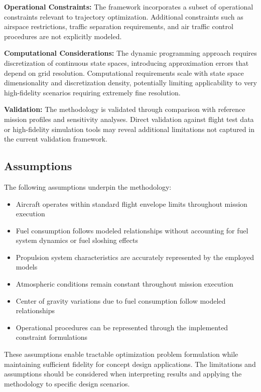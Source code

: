 \textbf{Operational Constraints:} The framework incorporates a subset of operational constraints relevant to trajectory optimization. Additional constraints such as airspace restrictions, traffic separation requirements, and air traffic control procedures are not explicitly modeled.

\textbf{Computational Considerations:} The dynamic programming approach requires discretization of continuous state spaces, introducing approximation errors that depend on grid resolution. Computational requirements scale with state space dimensionality and discretization density, potentially limiting applicability to very high-fidelity scenarios requiring extremely fine resolution.

\textbf{Validation:} The methodology is validated through comparison with reference mission profiles and sensitivity analyses. Direct validation against flight test data or high-fidelity simulation tools may reveal additional limitations not captured in the current validation framework.

\subsection{Assumptions}

The following assumptions underpin the methodology:

\begin{itemize}
    \item Aircraft operates within standard flight envelope limits throughout mission execution
    \item Fuel consumption follows modeled relationships without accounting for fuel system dynamics or fuel sloshing effects
    \item Propulsion system characteristics are accurately represented by the employed models
    \item Atmospheric conditions remain constant throughout mission execution
    \item Center of gravity variations due to fuel consumption follow modeled relationships
    \item Operational procedures can be represented through the implemented constraint formulations
\end{itemize}

These assumptions enable tractable optimization problem formulation while maintaining sufficient fidelity for concept design applications. The limitations and assumptions should be considered when interpreting results and applying the methodology to specific design scenarios.

